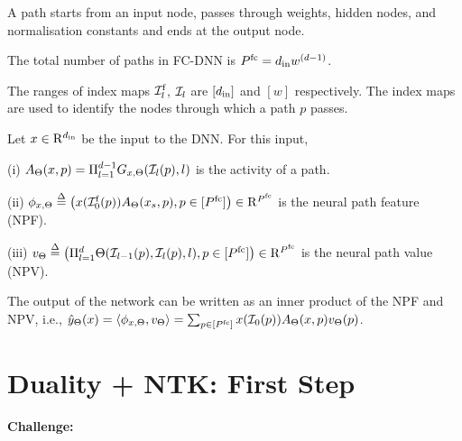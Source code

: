 \begin{definition}
A path starts from an input node, passes through weights, hidden nodes, and normalisation constants and ends at the output node.
\end{definition}
\begin{proposition}
The total number of paths in FC-DNN is $P^{\text{fc}}=d_{\text{in}} w^{(d-1)}$.
\end{proposition}
\begin{notation}
The ranges of index maps $\mathcal{I}^{\text{f}}_l$, $\mathcal{I}_l$ are $[d_{\text{in}}]$ and $[w]$ respectively. The index maps are used to identify the nodes through which a path $p$ passes.
\end{notation}

\begin{definition}\label{def:nps} Let $x\in\mathrm{R}^{d_{\text{in}}}$ be the input to the DNN. For this input, 

(i)  $A_{\Theta}(x,p)=\Pi_{l=1}^{d-1} G_{x,\Theta}(\mathcal{I}_l(p),l)$ is the activity of a path.

(ii)  $\phi_{x,\Theta}\stackrel{\Delta}{=} \left( x(\mathcal{I}^{\text{f}}_0(p))A_{\Theta}(x_s,p), p\in[P^{\text{fc}}]\right)\in\mathrm{R}^{P^{\text{fc}}}$ is the {neural path feature} (NPF).

(iii)  $v_{\Theta}\stackrel{\Delta}{=} \left( \Pi_{l=1}^d \Theta(\mathcal{I}_{l-1}(p),\mathcal{I}_l(p),l), p\in[P^{\text{fc}}]\right)\in\mathrm{R}^{P^{\text{fc}}}$ is the {neural path value} (NPV).
\end{definition}

\begin{proposition}\label{prop:zero}  The output of the network can be written as an inner product of the NPF and NPV, i.e., 
$\hat{y}_{\Theta}(x)=\langle \phi_{x,\Theta},v_{\Theta}\rangle=\sum_{p\in [P^{\text{fc}}]}x(\mathcal{I}_0(p))A_{\Theta}(x,p)v_{\Theta}(p)$.
\end{proposition}

\section{Duality + NTK: First Step}

\textbf{Challenge:}

